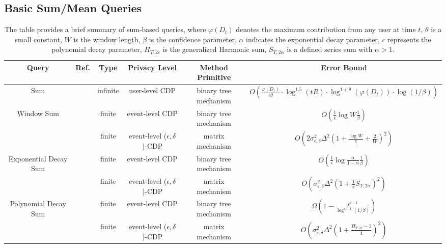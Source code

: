 \subsection{Basic Sum/Mean Queries}
\begin{table}[h]
	\renewcommand\arraystretch{1.5}
	\scriptsize
	\begin{tabular}{cccccc}%
		\toprule %
		\textbf{Query}&\textbf{Ref.} & \textbf{Type}&\textbf{Privacy Level}  & \textbf{Method Primitive}& \textbf{Error Bound} \\ %
		\midrule %
		\multirow{1}{*}{\parbox{3.2cm}{Sum}}&\cite{dong2023continual} & infinite  &user-level CDP & binary tree mechanism & $O(\frac{\varphi(D_t)}{\epsilon\theta}\cdot \log^{1.5}(tR)\cdot \log^{1+\theta}(\varphi(D_t))\cdot\log(1/\beta))$\\
		\hline
		\multirow{2}{*}{\parbox{3.2cm}{Window Sum}}&\cite{bolot2013private} & finite  &event-level CDP & binary tree mechanism & $O(\frac{1}{\epsilon}\log W\frac{1}{\beta})$\\
		&\cite{henzinger2024unifying} & finite  &event-level ($\epsilon, \delta$)-CDP & matrix mechanism & $O(2\sigma^2_{\epsilon, \delta}\Delta^2(1+\frac{\log W}{\pi}+\frac{2}{W})^2)$\\
		\hline
		\multirow{2}{*}{\parbox{3.2cm}{Exponential Decay Sum}}&\cite{bolot2013private} & finite  &event-level CDP & binary tree mechanism & $O(\frac{1}{\epsilon}\log \frac{\alpha}{1-\alpha}\frac{1}{\beta})$\\
		&\cite{henzinger2024unifying} & finite  &event-level ($\epsilon, \delta$)-CDP & matrix mechanism & $O(\sigma^2_{\epsilon, \delta}\Delta^2(1+\frac{1}{\pi}S_{T, 2\alpha})^2)$\\
		\hline
		\multirow{2}{*}{\parbox{3.2cm}{Polynomial Decay Sum}}&\cite{bolot2013private} & finite  &event-level CDP & binary tree mechanism & $\Omega(1-\frac{\epsilon^{c-1}}{\log^{c-1}(1/\beta)})$\\
		&\cite{henzinger2024unifying} & finite  &event-level ($\epsilon, \delta$)-CDP & matrix mechanism & $O(\sigma^2_{\epsilon, \delta}\Delta^2(1+\frac{H_{T, 2c}-1}{4})^2)$\\
		\bottomrule %
	\end{tabular}
	
	\caption{The table provides a brief summary of sum-based queries,  where $\varphi(D_t)$ denotes the maximum contribution from any user at time $t$, $\theta$ is a small constant,  $W$ is the window length, $\beta$ is the confidence parameter, $\alpha$ indicates the exponential decay parameter, $c$ represents the polynomial decay parameter, $H_{T, 2c}$ is the generalized Harmonic sum, $S_{T, 2\alpha}$ is a defined series sum with $\alpha>1$.} 
	\label{sum_query}
\end{table}


